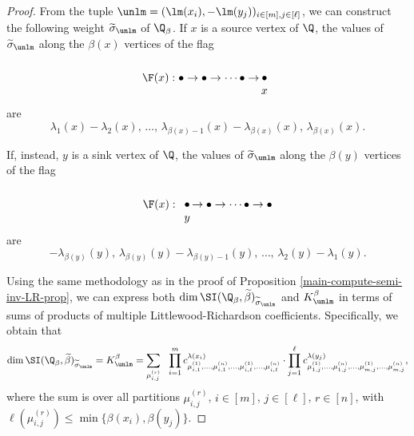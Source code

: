 \begin{proof} From the tuple $\unlm=(\lm(x_i), -\lm(y_j))_{i \in [m], j \in [\ell]}$, we can construct the following weight $\widetilde{\sigma}_{\unlm}$ of $\Q_\beta$.   If $x$ is a source vertex of $\Q$, the values of $\widetilde{\sigma}_{\unlm}$ along the $\beta(x)$ vertices of the flag 
\[
\F(x) :  \bullet \rightarrow \bullet \rightarrow \cdots \bullet \rightarrow \hspace{-6pt} \begin{array}{c}\\ \bullet \\ x \end{array}
\]
are 
\begin{equation} \label{wt-part-eqn1}
\lambda_1(x) - \lambda_2(x), \, \ldots, \, \lambda_{\beta(x)-1}(x) - \lambda_{\beta(x)}(x), \, \lambda_{\beta(x)}(x).
\end{equation}

If, instead, $y$ is a sink vertex of $\Q$, the values of $\widetilde{\sigma}_{\unlm}$ along the $\beta(y)$ vertices of the flag
\[
\F(x) : \begin{array}{c}\\ \bullet \\ y \end{array} \hspace{-6pt} \rightarrow \bullet \rightarrow \cdots \bullet \rightarrow \bullet
\]
are 
\begin{equation}\label{wt-part-eqn2}
-\lambda_{\beta(y)}(y), \,  \lambda_{\beta(y)}(y) - \lambda_{\beta(y)-1}(y), \, \ldots, \, \lambda_2(y) - \lambda_1(y).
\end{equation}

Using the same methodology as in the proof of Proposition \ref{main-compute-semi-inv-LR-prop}, we can express both $\dim \SI(\Q_\beta, \widetilde{\beta})_{\widetilde{\sigma}_{\unlm}}$ and $K^{\beta}_{\unlm}$ in terms of sums of products of multiple Littlewood-Richardson coefficients. Specifically, we obtain that  
\begin{equation}\label{eqn-mult-wt-semi-inv}
\dim \SI(\Q_\beta, \widetilde{\beta})_{\widetilde{\sigma}_{\unlm}}=K^{\beta}_{\unlm}=\sum_{\mu_{i,j}^{(r)}}\ \  \prod_{i=1}^m c^{\lambda(x_i)}_{\mu_{i,1}^{(1)}, \ldots, \mu_{i,1}^{(n)}, \ldots, \mu_{i,\ell}^{(1)}, \ldots, \mu_{i,\ell}^{(n)}} \cdot \prod_{j=1}^{\ell} c^{\lambda(y_j)}_{\mu_{1,j}^{(1)}, \ldots, \mu_{1,j}^{(n)}, \ldots, \mu_{m,j}^{(1)}, \ldots, \mu_{m,j}^{(n)}},
\end{equation}
where the sum is over all partitions $\mu^{(r)}_{i,j}$, $i \in [m]$, $j \in [\ell]$, $r \in [n]$, with $\ell(\mu^{(r)}_{i,j}) \leq \min\{\beta(x_i), \beta(y_j)\}$.


\end{proof}
